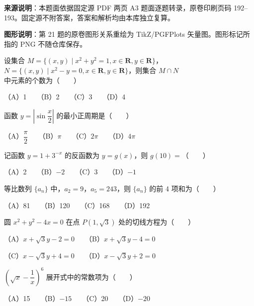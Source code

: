 

\begin{gktip}
\textbf{来源说明}：本题面依据固定源 PDF 两页 A3 题面逐题转录，原卷印刷页码 192–193。固定源不附答案，答案和解析均由本库独立复算。

\textbf{图形说明}：第 21 题的原卷图形关系重绘为 TikZ/PGFPlots 矢量图。图形标记所指的 PNG 不随仓库保存。
\end{gktip}


\begin{question}
设集合 $M=\{(x,y)\mid x^2+y^2=1,x\in\mathbf{R},y\in\mathbf{R}\}$，$N=\{(x,y)\mid x^2-y=0,x\in\mathbf{R},y\in\mathbf{R}\}$，则集合 $M\cap N$ 中元素的个数为\mbox{（　　）}

（A）1　　（B）2　　（C）3　　（D）4

\end{question}
\begin{question}
函数 $y=\left|\sin\dfrac{x}{2}\right|$ 的最小正周期是\mbox{（　　）}

（A）$\dfrac{\pi}{2}$　　（B）$\pi$　　（C）$2\pi$　　（D）$4\pi$

\end{question}
\begin{question}
记函数 $y=1+3^{-x}$ 的反函数为 $y=g(x)$，则 $g(10)=$\mbox{（　　）}

（A）2　　（B）$-2$　　（C）3　　（D）$-1$

\end{question}
\begin{question}
等比数列 $\{a_n\}$ 中，$a_2=9$，$a_5=243$，则 $\{a_n\}$ 的前 4 项和为\mbox{（　　）}

（A）81　　（B）120　　（C）168　　（D）192

\end{question}
\begin{question}
圆 $x^2+y^2-4x=0$ 在点 $P(1,\sqrt{3})$ 处的切线方程为\mbox{（　　）}

（A）$x+\sqrt{3}y-2=0$　　（B）$x+\sqrt{3}y-4=0$

（C）$x-\sqrt{3}y+4=0$　　（D）$x-\sqrt{3}y+2=0$

\end{question}
\begin{question}
$\left(\sqrt{x}-\dfrac{1}{x}\right)^6$ 展开式中的常数项为\mbox{（　　）}

（A）15　　（B）$-15$　　（C）20　　（D）$-20$

\end{question}
